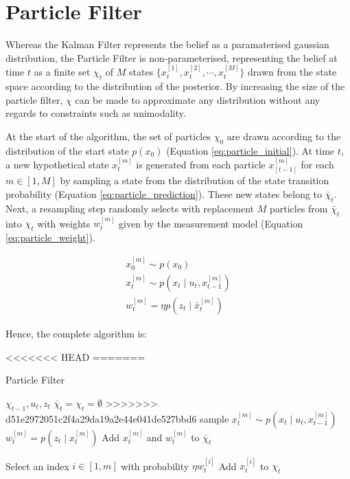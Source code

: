 \documentclass[english]{article}
\begin{document}
\section*{Particle Filter}

Whereas the Kalman Filter represents the belief as a paramaterised gaussian distribution, the Particle Filter is non-parameterised, representing the belief at time $t$ as a finite set $\chi_t$ of $M$ states $\{x^{[1]}_t, x^{[2]}_t, \cdots , x^{[M]}_t\}$ drawn from the state space according to the distribution of the posterior. By increasing the size of the particle filter, $\chi$ can be made to approximate any distribution without any regards to constraints such as unimodality\cite{Thrun02d}.

At the start of the algorithm, the set of particles $\chi_0$ are drawn according to the distribution of the start state $p(x_0)$ (Equation \ref{eq:particle_initial}). At time $t$, a new hypothetical state $x^{[m]}_t$ is generated from each particle $x^{[m]}_{[t-1]}$ for each $m \in [1,M]$ by sampling a state from the distribution of the state transition probability (Equation \ref{eq:particle_prediction}). These new states belong to $\bar{\chi}_t$. Next, a resampling step randomly selects with replacement $M$ particles from $\bar{\chi}_t$ into $\chi_t$ with weights $w^{[m]}_t$ given by the measurement model (Equation \ref{eq:particle_weight}).

\begin {align}
  x^{[m]}_0 \sim  p(x_0) \label{eq:particle_initial}\\
  x^{[m]}_t \sim p(x_t \mid u_t,x^{[m]}_{t-1}) \label{eq:particle_prediction} \\
  w^{[m]}_t = \eta p(z_t \mid \bar{x}^{[m]}_t) \label{eq:particle_weight}
\end {align}

Hence, the complete algorithm is:
\begin{algorithm}
<<<<<<< HEAD
=======
\caption{Particle Filter}
\label{alg:particle}
\begin{algorithmic}
	\REQUIRE $\chi_{t-1}, u_t, z_t$
        \STATE $\bar{\chi}_t = \chi_t = \emptyset$
>>>>>>> d51e2972051c2f4a29da19a2e44e041de527bbd6
        \STATE sample $x^{[m]}_t \sim p(x_t \mid u_t,x^{[m]}_{t-1})$
        \STATE $w^{[m]}_t = p(z_t \mid x^{[m]}_t)$
        \STATE Add $x^{[m]}_t$ and $w^{[m]}_t$ to $\bar{\chi}_t$
        \ENDFOR

        \STATE Select an index $i \in [1,m]$ with probability $\eta w^{[i]}_t$
        \STATE Add $x^{[i]}_t$ to $\chi_t$
        \ENDFOR

\end{algorithmic}
\end{algorithm}
\end{document}
